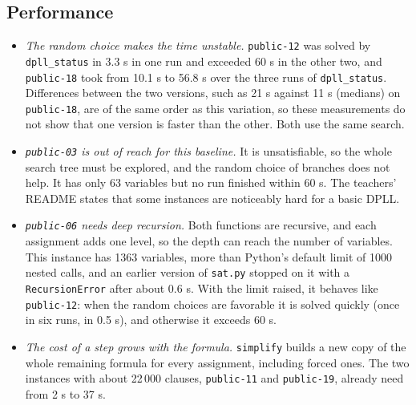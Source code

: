 \subsection{Performance}

\begin{itemize}
\item \emph{The random choice makes the time unstable.} \texttt{public-12} was solved by \texttt{dpll\_status} in 3.3 s in one run and exceeded 60 s in the other two, and \texttt{public-18} took from 10.1 s to 56.8 s over the three runs of \texttt{dpll\_status}. Differences between the two versions, such as 21 s against 11 s (medians) on \texttt{public-18}, are of the same order as this variation, so these measurements do not show that one version is faster than the other. Both use the same search.
\item \emph{\texttt{public-03} is out of reach for this baseline.} It is unsatisfiable, so the whole search tree must be explored, and the random choice of branches does not help. It has only 63 variables but no run finished within 60 s. The teachers' README states that some instances are noticeably hard for a basic DPLL.
\item \emph{\texttt{public-06} needs deep recursion.} Both functions are recursive, and each assignment adds one level, so the depth can reach the number of variables. This instance has 1363 variables, more than Python's default limit of 1000 nested calls, and an earlier version of \texttt{sat.py} stopped on it with a \texttt{RecursionError} after about 0.6 s. With the limit raised, it behaves like \texttt{public-12}: when the random choices are favorable it is solved quickly (once in six runs, in 0.5 s), and otherwise it exceeds 60 s.
\item \emph{The cost of a step grows with the formula.} \texttt{simplify} builds a new copy of the whole remaining formula for every assignment, including forced ones. The two instances with about 22\,000 clauses, \texttt{public-11} and \texttt{public-19}, already need from 2 s to 37 s.
\end{itemize}
